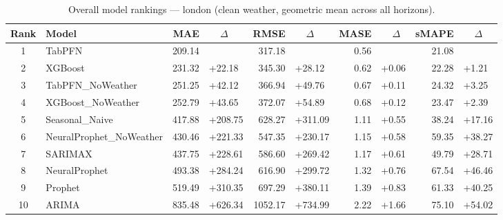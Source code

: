 \begin{table}[ht!]
\centering
\caption{Overall model rankings — london (clean weather, geometric mean across all horizons).}
\label{tab:overall_rankings_london}
{\small
\setlength{\tabcolsep}{3pt}
\scriptsize
\begin{tabular}{clrlrlrlrl}
\toprule
Rank & Model & MAE & ~~\(\Delta\) & RMSE & ~~\(\Delta\) & MASE & ~~\(\Delta\) & sMAPE & ~~\(\Delta\) \\
\midrule
1 & TabPFN & 209.14 &  & 317.18 &  & 0.56 &  & 21.08 &  \\
2 & XGBoost & 231.32 & +22.18 & 345.30 & +28.12 & 0.62 & +0.06 & 22.28 & +1.21 \\
3 & TabPFN\_NoWeather & 251.25 & +42.12 & 366.94 & +49.76 & 0.67 & +0.11 & 24.32 & +3.25 \\
4 & XGBoost\_NoWeather & 252.79 & +43.65 & 372.07 & +54.89 & 0.68 & +0.12 & 23.47 & +2.39 \\
5 & Seasonal\_Naive & 417.88 & +208.75 & 628.27 & +311.09 & 1.11 & +0.55 & 38.24 & +17.16 \\
6 & NeuralProphet\_NoWeather & 430.46 & +221.33 & 547.35 & +230.17 & 1.15 & +0.58 & 59.35 & +38.27 \\
7 & SARIMAX & 437.75 & +228.61 & 586.60 & +269.42 & 1.17 & +0.61 & 49.79 & +28.71 \\
8 & NeuralProphet & 493.38 & +284.24 & 616.90 & +299.72 & 1.32 & +0.76 & 67.54 & +46.46 \\
9 & Prophet & 519.49 & +310.35 & 697.29 & +380.11 & 1.39 & +0.83 & 61.33 & +40.25 \\
10 & ARIMA & 835.48 & +626.34 & 1052.17 & +734.99 & 2.22 & +1.66 & 75.10 & +54.02 \\
\bottomrule
\end{tabular}
}
\end{table}
